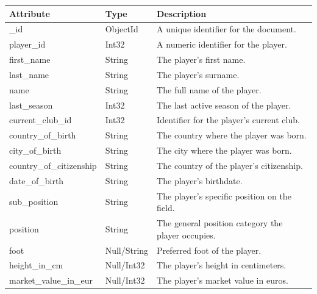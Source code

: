 \documentclass{Configuration_Files/PoliMi3i_thesis}
\begin{document}
\begin{tabular}{|l|l|p{8cm}|}
    \hline
    \textbf{Attribute}             & \textbf{Type}            & \textbf{Description} \\ \hline
    \_id                           & ObjectId                 & A unique identifier for the document. \\ \hline
    player\_id                     & Int32                    & A numeric identifier for the player. \\ \hline
    first\_name                    & String                   & The player's first name. \\ \hline
    last\_name                     & String                   & The player's surname. \\ \hline
    name                           & String                   & The full name of the player. \\ \hline
    last\_season                   & Int32                    & The last active season of the player. \\ \hline
    current\_club\_id              & Int32                    & Identifier for the player's current club. \\ \hline
    country\_of\_birth             & String                   & The country where the player was born. \\ \hline
    city\_of\_birth                & String                   & The city where the player was born. \\ \hline
    country\_of\_citizenship       & String                   & The country of the player's citizenship. \\ \hline
    date\_of\_birth                & String                   & The player's birthdate. \\ \hline
    sub\_position                  & String                   & The player's specific position on the field. \\ \hline
    position                       & String                   & The general position category the player occupies. \\ \hline
    foot                           & Null/String              & Preferred foot of the player. \\ \hline
    height\_in\_cm                 & Null/Int32               & The player's height in centimeters. \\ \hline
    market\_value\_in\_eur         & Null/Int32               & The player's market value in euros. \\ \hline

\end{tabular}
\end{document}
